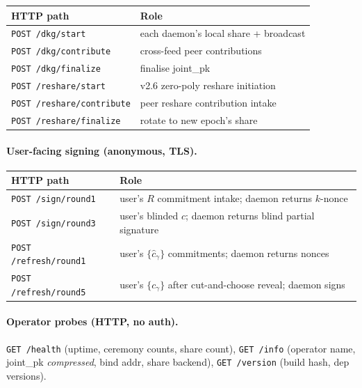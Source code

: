 \begin{center}
\small
\begin{tabular}{ll}
\toprule
HTTP path & Role \\
\midrule
\verb|POST /dkg/start|       & each daemon's local share + broadcast \\
\verb|POST /dkg/contribute|  & cross-feed peer contributions \\
\verb|POST /dkg/finalize|    & finalise joint\_pk \\
\verb|POST /reshare/start|   & v2.6 zero-poly reshare initiation \\
\verb|POST /reshare/contribute| & peer reshare contribution intake \\
\verb|POST /reshare/finalize|   & rotate to new epoch's share \\
\bottomrule
\end{tabular}
\end{center}

\paragraph{User-facing signing (anonymous, TLS).}

\begin{center}
\small
\begin{tabular}{ll}
\toprule
HTTP path & Role \\
\midrule
\verb|POST /sign/round1|     & user's $R$ commitment intake; daemon returns $k$-nonce \\
\verb|POST /sign/round3|     & user's blinded $c$; daemon returns blind partial signature \\
\verb|POST /refresh/round1|  & user's $\{\hat{c}_\gamma\}$ commitments; daemon returns nonces \\
\verb|POST /refresh/round5|  & user's $\{c_\gamma\}$ after cut-and-choose reveal; daemon signs \\
\bottomrule
\end{tabular}
\end{center}

\paragraph{Operator probes (HTTP, no auth).}
\verb|GET /health| (uptime, ceremony counts, share count),
\verb|GET /info| (operator name, joint\_pk \emph{compressed}, bind
addr, share backend), \verb|GET /version| (build hash, dep
versions).

